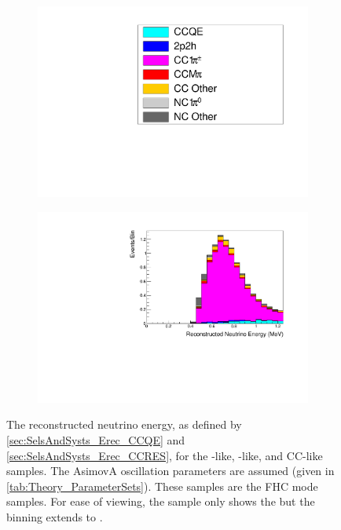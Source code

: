 \begin{figure}[h]
\begin{subfigure}[t]{0.49\textwidth}
  \end{subfigure}
  \begin{subfigure}[t]{0.49\textwidth}
    \includegraphics[width=\textwidth, trim={0mm 0mm 0mm 0mm}, clip,page=1]{Figures/Selections/Legend.pdf}
  \end{subfigure}%
  \begin{subfigure}[t]{0.49\textwidth}
    \includegraphics[width=\textwidth, trim={0mm 0mm 0mm 0mm}, clip,page=1]{Figures/Selections/FHCCC1pi-2020_X.pdf}
  \end{subfigure}
  \caption{The reconstructed neutrino energy, as defined by \autoref{sec:SelsAndSysts_Erec_CCQE} and \autoref{sec:SelsAndSysts_Erec_CCRES}, for the -like, -like, and CC\quickmath{1\pi^{+}}-like samples. The AsimovA oscillation parameters are assumed (given in \autoref{tab:Theory_ParameterSets}). These samples are the FHC mode samples. For ease of viewing, the  sample only shows the  but the binning extends to .}
  \label{fig:SelsAndSysts_Beam_ERecSpectra}
\end{figure}

